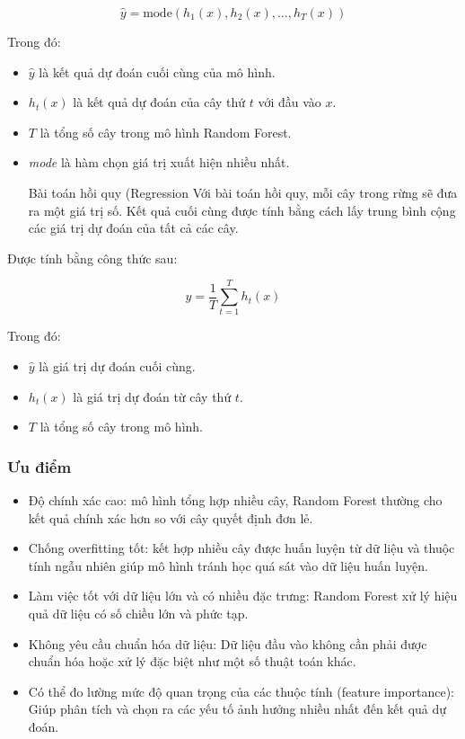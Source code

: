 \documentclass[
]{article}
\providecommand{\tightlist}{%
  \setlength{\itemsep}{0pt}\setlength{\parskip}{0pt}}
\begin{document}
\[
\hat{y} = \text{mode}(h_1(x), h_2(x), \ldots, h_T(x))
\]

Trong đó:

\begin{itemize}
\item
  \emph{\(\hat{y}\)} là kết quả dự đoán cuối cùng của mô hình.
\item
  \emph{\(h_t(x)\)} là kết quả dự đoán của cây thứ \emph{\(t\)} với đầu
  vào \emph{\(x\)}.
\item
  \emph{\(T\)} là tổng số cây trong mô hình Random Forest.
\item
  \emph{mode} là hàm chọn giá trị xuất hiện nhiều nhất.

  Bài toán hồi quy (Regression Với bài toán hồi quy, mỗi cây trong rừng
  sẽ đưa ra một giá trị số. Kết quả cuối cùng được tính bằng cách lấy
  trung bình cộng các giá trị dự đoán của tất cả các cây.
\end{itemize}

Được tính bằng công thức sau:

\[
\hat{y} = \frac{1}{T} \sum_{t=1}^{T} h_t(x)
\]

Trong đó:

\begin{itemize}
\tightlist
\item
  \emph{\(\hat{y}\)} là giá trị dự đoán cuối cùng.
\item
  \emph{\(h_t(x)\)} là giá trị dự đoán từ cây thứ \emph{\(t\)}.
\item
  \emph{\(T\)} là tổng số cây trong mô hình.
\end{itemize}

\subsubsection{Ưu điểm}\label{ux1b0u-ux111iux1ec3m-3}

\begin{itemize}
\item
  Độ chính xác cao: mô hình tổng hợp nhiều cây, Random Forest thường cho
  kết quả chính xác hơn so với cây quyết định đơn lẻ.
\item
  Chống overfitting tốt: kết hợp nhiều cây được huấn luyện từ dữ liệu và
  thuộc tính ngẫu nhiên giúp mô hình tránh học quá sát vào dữ liệu huấn
  luyện.
\item
  Làm việc tốt với dữ liệu lớn và có nhiều đặc trưng: Random Forest xử
  lý hiệu quả dữ liệu có số chiều lớn và phức tạp.
\item
  Không yêu cầu chuẩn hóa dữ liệu: Dữ liệu đầu vào không cần phải được
  chuẩn hóa hoặc xử lý đặc biệt như một số thuật toán khác.
\item
  Có thể đo lường mức độ quan trọng của các thuộc tính (feature
  importance): Giúp phân tích và chọn ra các yếu tố ảnh hưởng nhiều nhất
  đến kết quả dự đoán.
\end{itemize}
\end{document}
